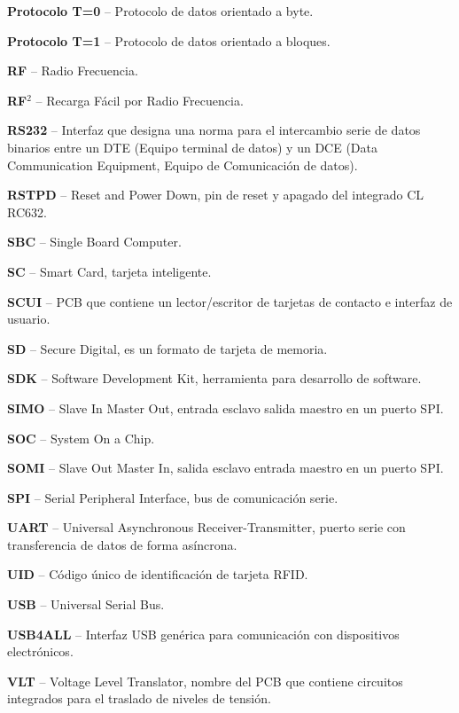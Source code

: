 \begin{glosario}
{\bf{Protocolo T=0}} – Protocolo de datos orientado a byte.

{\bf{Protocolo T=1}} – Protocolo de datos orientado a bloques.

{\bf{RF}} – Radio Frecuencia.

{\bf{RF$^{2}$}} – Recarga Fácil por Radio Frecuencia.

{\bf{RS232}} – Interfaz que designa una norma para el intercambio serie de datos binarios entre un DTE (Equipo terminal de datos) y un DCE (Data Communication Equipment, Equipo de Comunicación de datos).

{\bf{RSTPD}} – Reset and Power Down, pin de reset y apagado del integrado CL RC632.

{\bf{SBC}} – Single Board Computer.

{\bf{SC}} – Smart Card, tarjeta inteligente.

{\bf{SCUI}} – PCB que contiene un lector/escritor de tarjetas de contacto e interfaz de usuario.

{\bf{SD}} – Secure Digital, es un formato de tarjeta de memoria.

{\bf{SDK}} – Software Development Kit, herramienta para desarrollo de software.

{\bf{SIMO}} – Slave In Master Out, entrada esclavo salida maestro en un puerto SPI.

{\bf{SOC}} – System On a Chip.

{\bf{SOMI}} – Slave Out Master In, salida esclavo entrada maestro en un puerto SPI.

{\bf{SPI}} – Serial Peripheral Interface, bus de comunicación serie.

{\bf{UART}} – Universal Asynchronous Receiver-Transmitter, puerto serie con transferencia de datos de forma asíncrona.

{\bf{UID}} – Código único de identificación de tarjeta RFID.

{\bf{USB}} – Universal Serial Bus.

{\bf{USB4ALL}} – Interfaz USB genérica para comunicación con dispositivos electrónicos.

{\bf{VLT}} – Voltage Level Translator, nombre del PCB que contiene circuitos integrados para el traslado de niveles de tensión.

\end{glosario}